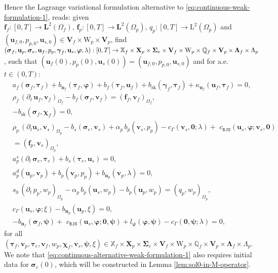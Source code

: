 \documentclass[11pt]{article}
\numberwithin{equation}{section}
\newcommand{\ds}{\displaystyle}
\newcommand{\bgamma}{{\boldsymbol\gamma}}
\newcommand{\bLambda}{{\boldsymbol\Lambda}}
\newcommand{\bsi}{{\boldsymbol\sigma}}
\newcommand{\bSigma}{{\boldsymbol\Sigma}}
\newcommand{\bvarphi}{{\boldsymbol\varphi}}
\newcommand{\bpsi}{{\boldsymbol\psi}}
\newcommand{\btau}{{\boldsymbol\tau}}
\newcommand{\bchi}{{\boldsymbol\chi}}
\newcommand{\bv}{{\mathbf{v}}}
\newcommand{\f}{\mathbf{f}}
\newcommand{\bu}{\mathbf{u}}
\newcommand{\bn}{{\mathbf{n}}}
\newcommand{\0}{{\mathbf{0}}}
\def\bX{\mathbf{X}}
\def\bV{\mathbf{V}}
\newcommand{\bL}{\mathbf{L}}
\newcommand\bbQ{\mathbb{Q}}
\newcommand\bbX{\mathbb{X}}
\def\L{\mathrm{L}}
\def\W{\mathrm{W}}
\def\BJS{\mathtt{BJS}}
\def\sk{\mathrm{sk}}
\numberwithin{equation}{section}
\begin{document}
Hence the Lagrange variational formulation alternative to \eqref{eq:continuous-weak-formulation-1}, reads:
given $\f_f:[0,T]\to \bL^2(\Omega_f),\, \f_p : [0,T]\to \bL^2(\Omega_p),\, q_p:[0,T]\to \L^2(\Omega_p)$ and $(\bu_{f,0},p_{p,0},\bu_{s,0})\in \bV_f\times \W_p\times \bV_p$, find $(\bsi_f, \bu_p, \bsi_e, \bu_f, p_p, \bgamma_f, \newline \bu_s, \bvarphi, \lambda) : [0,T]\to \bbX_f\times \bX_p\times \bSigma_e\times \bV_f\times \W_p\times \bbQ_f\times \bV_p\times \bLambda_f\times \Lambda_p$, such that $(\bu_f(0),p_p(0),\bu_s(0)) = (\bu_{f,0},p_{p,0},\bu_{s,0})$ and for a.e. $t\in (0,T)$:
\begin{subequations}\label{eq:continuous-alternative-weak-formulation-1}
\begin{align}
& \ds a_f(\bsi_f,\btau_f) + b_{\bn_f}(\btau_f,\bvarphi) + b_f(\btau_f,\bu_f) + b_\sk(\bgamma_f,\btau_f)+\kappa_{\bu_f}(\bu_f, \btau_f) = 0, \label{eq:continuous-alternative-weak-formulation-1a}\\[1ex]
& \ds \rho_f\, (\partial_t\,\bu_f,\bv_f)_{\Omega_f} -b_f(\bsi_f,\bv_f) = (\f_f,\bv_f)_{\Omega_f}, \label{eq:continuous-alternative-weak-formulation-1b} \\[1ex]
& \ds - b_\sk(\bsi_f,\bchi_f) = 0, \label{eq:continuous-alternative-weak-formulation-1c} \\[1ex]
& \ds \rho_p\,(\partial_t\bu_s,\bv_s)_{\Omega_p}  - b_s(\bsi_e,\bv_s)  + \alpha_p\,b_p(\bv_s,p_p) - c_{\Gamma}(\bv_s,\0;\lambda)+\,\, c_{\BJS}(\bu_s,\bvarphi;\bv_s,\0)  \nonumber \\[0.5ex] 
& \ds = (\f_p,\bv_s)_{\Omega_p},\label{eq:continuous-alternative-weak-formulation-1d1} \\[1ex]
& \ds a^s_p(\partial_t\,\bsi_e,\btau_e) + b_s(\btau_e,\bu_s)= 0, \label{eq:continuous-alternative-weak-formulation-1d2} \\[1ex]
& \ds a^d_p(\bu_p,\bv_p) + b_p(\bv_p,p_p) + b_{\bn_p}(\bv_p,\lambda) = 0, \label{eq:continuous-alternative-weak-formulation-1e} \\[1ex]
& \ds s_0\,(\partial_t\, p_p,w_p)_{\Omega_p}  - \alpha_p\,b_p(\bu_s,w_p)  - b_p(\bu_p,w_p) = (q_p,w_p)_{\Omega_p},\label{eq:continuous-alternative-weak-formulation-1f} \\[1ex]
& \ds c_{\Gamma}(\bu_s,\bvarphi;\xi) - b_{\bn_p}(\bu_p,\xi) = 0, \label{eq:continuous-alternative-weak-formulation-1g} \\[1ex]
& \ds - b_{\bn_f}(\bsi_f,\bpsi) + \,\, c_{\BJS}(\bu_s,\bvarphi;\0,\bpsi) + l_{\bvarphi}(\bvarphi,\bpsi) - c_{\Gamma}(\0,\bpsi;\lambda) = 0,\label{eq:continuous-alternative-weak-formulation-1h}
\end{align}
\end{subequations}
for all $(\btau_f, \bv_p, \btau_e, \bv_f, w_p, \bchi_f, \bv_s, \bpsi, \xi)\in \bbX_f\times \bX_p\times \bSigma_e\times \bV_f\times \W_p\times \bbQ_f\times \bV_p\times \bLambda_f\times \Lambda_p$. We note that \eqref{eq:continuous-alternative-weak-formulation-1} also requires initial data for $\bsi_e(0)$, which will be constructed in Lemma \ref{lem:sol0-in-M-operator}.
\end{document}

